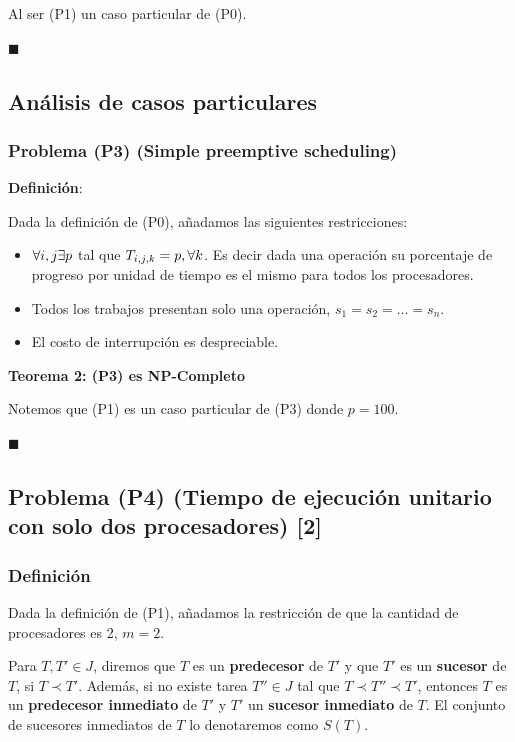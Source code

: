 \documentclass[14pt]{extarticle}
\begin{document}
Al ser (P1) un caso particular de (P0).

$\blacksquare$

\subsection*{Análisis de casos particulares}

\subsubsection*{Problema (P3) (Simple preemptive scheduling)}

\textbf{Definición}:

Dada la definición de (P0), añadamos las siguientes restricciones:

\begin{itemize}
    \item $\forall i, j \space \exists p$ tal que $T_{i, j, k} = p, \space \forall k$. Es decir dada una operación su porcentaje de progreso por unidad de tiempo es el mismo para todos los procesadores.
    \item Todos los trabajos presentan solo una operación, $s_1 = s_2 = \ldots = s_n$.
    \item El costo de interrupción es despreciable.
\end{itemize}

\textbf{Teorema 2: (P3) es NP-Completo}

Notemos que (P1) es un caso particular de (P3) donde $p = 100$.

$\blacksquare$

\subsection*{Problema (P4) (Tiempo de ejecución unitario con solo dos procesadores) [2]}

\subsubsection*{Definición}

Dada la definición de (P1), añadamos la restricción de que la cantidad de procesadores es 2, $m = 2$.

Para $T, T' \in J$, diremos que $T$ es un \textbf{predecesor} de $T'$ y que $T'$ es un \textbf{sucesor} de $T$, si $T \prec T'$. Además, si no existe tarea $T'' \in J$ tal que $T \prec T'' \prec T'$, entonces $T$ es un \textbf{predecesor inmediato} de $T'$ y $T'$ un \textbf{sucesor inmediato} de $T$. El conjunto de sucesores inmediatos de $T$ lo denotaremos como $S(T)$.
\end{document}
